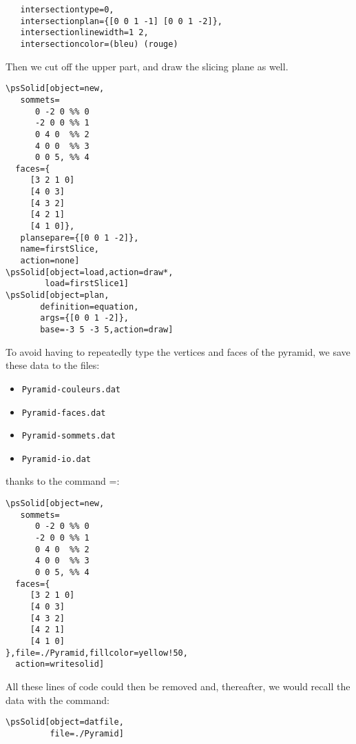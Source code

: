  \begin{verbatim}
   intersectiontype=0,
   intersectionplan={[0 0 1 -1] [0 0 1 -2]},
   intersectionlinewidth=1 2,
   intersectioncolor=(bleu) (rouge)
 \end{verbatim}

Then we cut off the upper part, and draw the slicing plane as
well.

 \begin{verbatim}
\psSolid[object=new,
   sommets=
      0 -2 0 %% 0
      -2 0 0 %% 1
      0 4 0  %% 2
      4 0 0  %% 3
      0 0 5, %% 4
  faces={
     [3 2 1 0]
     [4 0 3]
     [4 3 2]
     [4 2 1]
     [4 1 0]},
   plansepare={[0 0 1 -2]},
   name=firstSlice,
   action=none]
\psSolid[object=load,action=draw*,
        load=firstSlice1]
\psSolid[object=plan,
       definition=equation,
       args={[0 0 1 -2]},
       base=-3 5 -3 5,action=draw]
 \end{verbatim}

To avoid having to repeatedly type the vertices and faces of the
pyramid, we save these data to the files:
\begin{itemize}
  \item \texttt{Pyramid-couleurs.dat}
  \item \texttt{Pyramid-faces.dat}
  \item \texttt{Pyramid-sommets.dat}
  \item \texttt{Pyramid-io.dat}
\end{itemize}
thanks to the command =:

 \begin{verbatim}
\psSolid[object=new,
   sommets=
      0 -2 0 %% 0
      -2 0 0 %% 1
      0 4 0  %% 2
      4 0 0  %% 3
      0 0 5, %% 4
  faces={
     [3 2 1 0]
     [4 0 3]
     [4 3 2]
     [4 2 1]
     [4 1 0]
},file=./Pyramid,fillcolor=yellow!50,
  action=writesolid]
 \end{verbatim}

All these lines of code could then be removed and, thereafter, we
would recall the data with the command:

 \begin{verbatim}
\psSolid[object=datfile,
         file=./Pyramid]
 \end{verbatim}

